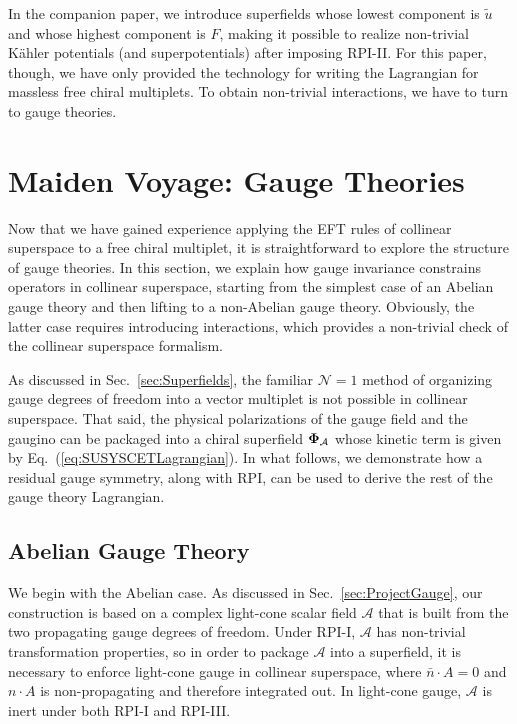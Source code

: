 \documentclass[12pt,document,nofootinbib,superscriptaddress,onecolumn,preprintnumbers,balancelastpage]{article}
\DeclareRobustCommand{\Sec}[1]{Sec.~\ref{#1}}
\DeclareRobustCommand{\Eq}[1]{Eq.~(\ref{#1})}
\newcommand{\alc}{\mathcal{A}}
\newcommand{\bPhiA}{\bold \Phi_{\alc}}
\begin{document}
\begin{spacing}{1.2}
In the companion paper, we introduce superfields whose lowest component is $\tilde{u}$ and whose highest component is $F$, making it possible to realize non-trivial K\"ahler potentials (and superpotentials) after imposing RPI-II.
%
For this paper, though, we have only provided the technology for writing the Lagrangian for massless free chiral multiplets.
%
To obtain non-trivial interactions, we have to turn to gauge theories.


\section{Maiden Voyage:  Gauge Theories}
\label{sec:Gaugetheory}

Now that we have gained experience applying the EFT rules of collinear superspace to a free chiral multiplet, it is straightforward to explore the structure of gauge theories.
%
In this section, we explain how gauge invariance constrains operators in collinear superspace, starting from the simplest case of an Abelian gauge theory and then lifting to a non-Abelian gauge theory.
%
Obviously, the latter case requires introducing interactions, which provides a non-trivial check of the collinear superspace formalism.


As discussed in \Sec{sec:Superfields}, the familiar $\mathcal{N} =1$ method of organizing gauge degrees of freedom into a vector multiplet is not possible in collinear superspace.
%
That said, the physical polarizations of the gauge field and the gaugino can be packaged into a chiral superfield $\bPhiA$ whose kinetic term is given by \Eq{eq:SUSYSCETLagrangian}. 
%
In what follows, we demonstrate how a residual gauge symmetry, along with RPI, can be used to derive the rest of the gauge theory Lagrangian.

\subsection{Abelian Gauge Theory}
We begin with the Abelian case.  
%
As discussed in \Sec{sec:ProjectGauge}, our construction is based on a complex light-cone scalar field $\alc$ that is built from the two propagating gauge degrees of freedom.
%
Under RPI-I, $\alc$ has non-trivial transformation properties, so in order to package $\alc$ into a superfield, it is necessary to enforce light-cone gauge in collinear superspace, where $\bar{n}\cdot A = 0$ and $n\cdot A$ is non-propagating and therefore integrated out.
%
In light-cone gauge, $\alc$ is inert under both RPI-I and RPI-III.


\end{spacing}
\end{document}

